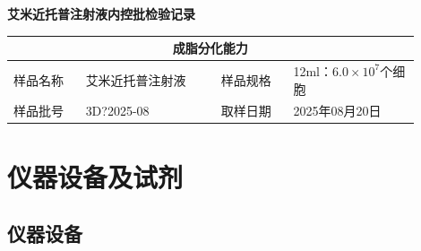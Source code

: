 \documentclass[UTF8,10pt,a4paper,fontset=fandol]{ctexart}
\newcommand{\fieldvalue}[1]{#1}
\newcommand{\handwritten}[1]{#1}
\begin{document}
\begin{center}
\textbf{艾米近托普注射液内控批检验记录}
\end{center}

\begin{center}
\begin{tabular}{|p{0.16\linewidth}|p{0.30\linewidth}|p{0.16\linewidth}|p{0.28\linewidth}|}
\hline
\multicolumn{4}{|c|}{\textbf{成脂分化能力}}\\
\hline
样品名称 &
\fieldvalue{艾米近托普注射液} &
样品规格 &
\fieldvalue{12ml：$6.0\times10^{7}$个细胞}\\
\hline
样品批号 &
\fieldvalue{\handwritten{3D?2025-08}} &
取样日期 &
\fieldvalue{\handwritten{2025年08月20日}}\\
\hline
\end{tabular}
\end{center}

\section{仪器设备及试剂}

\subsection{仪器设备}
\end{document}
